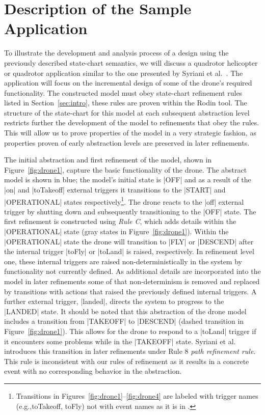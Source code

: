 \section{Description of the Sample Application}
\label{sec:descr-sample-appl}

To illustrate the development and analysis process of a design using the previously described 
state-chart semantics, we will discuss a quadrotor helicopter or quadrotor application similar to 
the one presented by Syriani et al.~\cite{Syriani_2019}. 
The application will focus on the incremental design of some of the drone's required functionality.
The constructed model must obey state-chart refinement rules listed in Section~\ref{sec:intro}, these rules are proven within the Rodin tool.
The structure of the state-chart for this model at each subsequent abstraction level restricts further the development of the model to refinements that obey the rules. 
This will allow us to prove properties of the model in a very strategic fashion, as properties proven of early abstraction levels are preserved in later refinements.

The initial abstraction and first refinement of the model, shown in Figure~\ref{fig:drone1}, capture the basic functionality of the drone. 
The abstract model is shown in blue; the model's initial state is |OFF| and as a result of the |on| and  |toTakeoff| external triggers it transitions to the |START| and |OPERATIONAL| states respectively\footnote{Transitions in Figures~\ref{fig:drone1}--\ref{fig:drone4} are labeled with trigger names
(e.g.,toTakeoff, toFly) not with event names as it is in \UMLB.}. 
The drone reacts to the |off| external trigger by shutting down and subsequently transitioning to the |OFF| state.
The first refinement is constructed using \emph{Rule C}, which adds details within the |OPERATIONAL| state (gray states in Figure~\ref{fig:drone1}).
Within the |OPERATIONAL| state the drone will transition to |FLY| or |DESCEND| after the internal trigger |toFly| or |toLand| is raised, respectively. 
In refinement level one, these internal triggers are raised non-deterministically in the system by functionality not currently defined.
As additional details are incorporated into the model in later refinements some of that non-determinism is 
removed and replaced by transitions with actions that raised the previously defined internal triggers.
A further external trigger, |landed|, directs the system to progress to the |LANDED| state.
It should be noted that this abstraction of the drone model includes a transition from |TAKEOFF| to |DESCEND| (dashed transition in Figure~\ref{fig:drone1}). 
This allows for the drone to respond to a |toLand| trigger if it encounters some problems while in the |TAKEOFF| state.
Syriani et al.~\cite{Syriani_2019} introduces this transition in later refinements under Rule 8 \emph{path refinement rule}. 
This rule is inconsistent with our rules of refinement as it results in a concrete event with no corresponding behavior in the abstraction.

